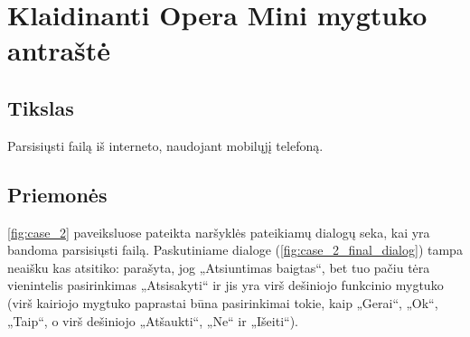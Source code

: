 \chapter{Klaidinanti Opera Mini mygtuko antraštė}

\section{Tikslas}

Parsisiųsti failą iš interneto, naudojant mobilųjį telefoną.

\section{Priemonės}

\ref{fig:case_2} paveiksluose pateikta naršyklės pateikiamų dialogų
seka, kai yra bandoma parsisiųsti failą. Paskutiniame dialoge
(\ref{fig:case_2_final_dialog}) tampa neaišku kas atsitiko: parašyta,
jog „Atsiuntimas baigtas“, bet tuo pačiu tėra vienintelis
pasirinkimas „Atsisakyti“ ir jis yra virš dešiniojo funkcinio
mygtuko (virš kairiojo mygtuko paprastai būna pasirinkimai tokie,
kaip „Gerai“, „Ok“, „Taip“, o virš dešiniojo „Atšaukti“,
„Ne“ ir „Išeiti“).

